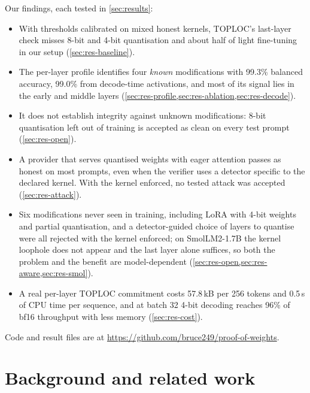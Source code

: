 \documentclass[10pt,twocolumn]{article}
\begin{document}
Our findings, each tested in \cref{sec:results}:
\begin{itemize}
  \item With thresholds calibrated on mixed honest kernels, TOPLOC's last-layer check misses 8-bit and 4-bit quantisation and about half of light fine-tuning in our setup (\cref{sec:res-baseline}).
  \item The per-layer profile identifies four \emph{known} modifications with 99.3\% balanced accuracy, 99.0\% from decode-time activations, and most of its signal lies in the early and middle layers (\cref{sec:res-profile,sec:res-ablation,sec:res-decode}).
  \item It does not establish integrity against unknown modifications: 8-bit quantisation left out of training is accepted as clean on every test prompt (\cref{sec:res-open}).
  \item A provider that serves quantised weights with eager attention passes as honest on most prompts, even when the verifier uses a detector specific to the declared kernel. With the kernel enforced, no tested attack was accepted (\cref{sec:res-attack}).
  \item Six modifications never seen in training, including LoRA with 4-bit weights and partial quantisation, and a detector-guided choice of layers to quantise were all rejected with the kernel enforced; on SmolLM2-1.7B the kernel loophole does not appear and the last layer alone suffices, so both the problem and the benefit are model-dependent (\cref{sec:res-open,sec:res-aware,sec:res-smol}).
  \item A real per-layer TOPLOC commitment costs 57.8\,kB per 256 tokens and 0.5\,s of CPU time per sequence, and at batch 32 4-bit decoding reaches 96\% of bf16 throughput with less memory (\cref{sec:res-cost}).
\end{itemize}
Code and result files are at \url{https://github.com/bruce249/proof-of-weights}.

\section{Background and related work}
\label{sec:related}
\end{document}
